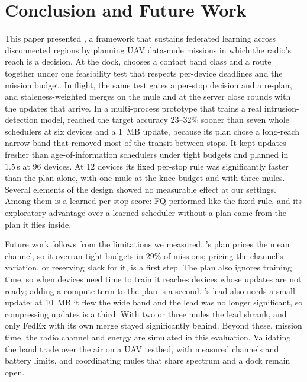 \section{Conclusion and Future Work}
\label{sec:conclusion}

This paper presented \sysname{}, a framework that sustains federated learning
across disconnected regions by planning UAV data-mule missions in which the
radio's reach is a decision. At the dock, \sysname{} chooses a contact band
class and a route together under one feasibility test that respects per-device
deadlines and the mission budget. In flight, the same test gates a per-stop
decision and a re-plan, and staleness-weighted merges on the mule and at the
server close rounds with the updates that arrive. In a multi-process prototype
that trains a real intrusion-detection model, \sysname{} reached the target
accuracy 23--32\% sooner than seven whole schedulers at six devices and a 1~MB
update, because its
plan chose a long-reach narrow band that removed most of the transit between
stops. It kept updates fresher than age-of-information schedulers under tight
budgets and planned in 1.5\,s at 96 devices. At 12 devices its fixed per-stop rule
was significantly faster than the plan alone, with one mule at the knee budget and
with three mules. Several elements of the design showed no measurable
effect at our settings. Among them is a learned per-stop score: FQ performed like
the fixed rule, and its exploratory advantage over a learned scheduler without a
plan came from the plan it flies inside.

Future work follows from the limitations we measured. \sysname{}'s plan prices
the mean channel, so it overran tight budgets in 29\% of missions; pricing the
channel's variation, or reserving slack for it, is a first step. The plan also
ignores training time, so when devices need time to train it reaches devices
whose updates are not ready; adding a compute term to the plan is a second.
\sysname{}'s lead also needs a small update: at 10~MB it flew the wide band and the lead was
no longer significant, so compressing updates is a third. With two or three mules
the lead shrank, and only FedEx with its own merge stayed significantly behind.
Beyond these, mission time, the radio channel and energy are simulated in this
evaluation. Validating the band trade over the air on a UAV testbed, with
measured channels and battery limits, and coordinating mules that share
spectrum and a dock remain open.

